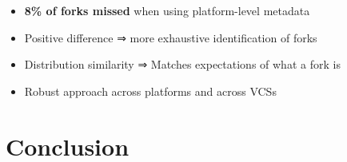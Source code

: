\documentclass[aspectratio=169,xcolor=table]{beamer}
\begin{document}
\begin{frame}
\begin{center}
        \end{center}
        \begin{block}{}
            \begin{itemize}
                \item \textbf{8\% of forks missed} when using platform-level
                    metadata
                \item Positive difference ⇒ more exhaustive identification of
                    forks
                \item Distribution similarity ⇒ Matches
                    expectations of what a fork is
                \item Robust approach across platforms and across VCSs
            \end{itemize}
        \end{block}
    \end{frame}




    \section{Conclusion}
\end{document}
